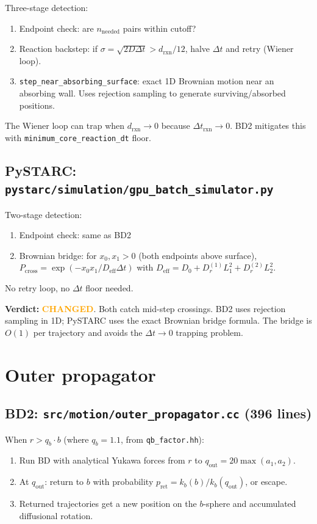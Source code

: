 \documentclass[11pt]{article}
\newcommand{\changed}{\textcolor{Orange}{\textbf{CHANGED}}}
\begin{document}
Three-stage detection:
\begin{enumerate}
\item Endpoint check: are $n_\mathrm{needed}$ pairs within cutoff?
\item Reaction backstep: if $\sigma = \sqrt{2D\Delta t} > d_\mathrm{rxn}/12$,
  halve $\Delta t$ and retry (Wiener loop).
\item \texttt{step\_near\_absorbing\_surface}: exact 1D Brownian motion near
  an absorbing wall. Uses rejection sampling to generate surviving/absorbed positions.
\end{enumerate}
The Wiener loop can trap when $d_\mathrm{rxn} \to 0$ because $\Delta t_\mathrm{rxn} \to 0$.
BD2 mitigates this with \texttt{minimum\_core\_reaction\_dt} floor.

\subsection{PySTARC: \texttt{pystarc/simulation/gpu\_batch\_simulator.py}}

Two-stage detection:
\begin{enumerate}
\item Endpoint check: same as BD2
\item Brownian bridge: for $x_0, x_1 > 0$ (both endpoints above surface),
  $P_\mathrm{cross} = \exp(-x_0 x_1 / D_\mathrm{eff}\Delta t)$
  with $D_\mathrm{eff} = D_0 + D_r^{(1)}L_1^2 + D_r^{(2)}L_2^2$.
\end{enumerate}
No retry loop, no $\Delta t$ floor needed.

\textbf{Verdict:} \changed. Both catch mid-step crossings.
BD2 uses rejection sampling in 1D; PySTARC uses the exact Brownian
bridge formula. The bridge is $O(1)$ per trajectory and avoids the
$\Delta t \to 0$ trapping problem.


\section{Outer propagator}

\subsection{BD2: \texttt{src/motion/outer\_propagator.cc} (396 lines)}
When $r > q_b \cdot b$ (where $q_b = 1.1$, from \texttt{qb\_factor.hh}):
\begin{enumerate}
\item Run BD with analytical Yukawa forces from $r$ to $q_\mathrm{out} = 20\max(a_1,a_2)$.
\item At $q_\mathrm{out}$: return to $b$ with probability $p_\mathrm{ret} = k_b(b)/k_b(q_\mathrm{out})$,
  or escape.
\item Returned trajectories get a new position on the $b$-sphere and accumulated diffusional rotation.
\end{enumerate}
\end{document}
